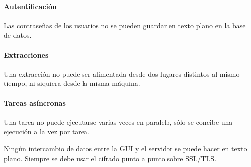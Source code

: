 \begin{functional}
\paragraph{Autentificación}
 \item Las contraseñas de los usuarios no se pueden guardar en texto plano en la base de datos.
 \paragraph{Extracciones}
 \item Una extracción no puede ser alimentada desde dos lugares distintos al mismo tiempo, ni siquiera desde la misma máquina.
 \paragraph{Tareas asíncronas}
 \item Una tarea no puede ejecutarse varias veces en paralelo, sólo se concibe una ejecución a la vez por tarea.
 \item Ningún intercambio de datos entre la GUI y el servidor se puede hacer en texto plano. Siempre se debe usar el cifrado punto a punto sobre SSL/TLS.
\end{functional}